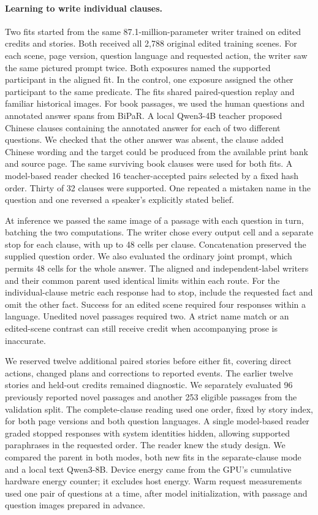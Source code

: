 \documentclass[12pt,a4paper]{article}
\providecommand{\DIFadd}[1]{{\protect\color{blue} \sf #1}} %
\begin{document}
\paragraph{\DIFadd{Learning to write individual clauses.}}
\DIFadd{Two fits started from the same 87.1-million-parameter writer trained on edited credits and stories. Both received all 2,788 original edited training scenes. For each scene, page version, question language and requested action, the writer saw the same pictured prompt twice. Both exposures named the supported participant in the aligned fit. In the control, one exposure assigned the other participant to the same predicate. The fits shared paired-question replay and familiar historical images. For book passages, we used the human questions and annotated answer spans from BiPaR. A local Qwen3-4B teacher proposed Chinese clauses containing the annotated answer for each of two different questions. We checked that the other answer was absent, the clause added Chinese wording and the target could be produced from the available print bank and source page. The same surviving book clauses were used for both fits. A model-based reader checked 16 teacher-accepted pairs selected by a fixed hash order. Thirty of 32 clauses were supported. One repeated a mistaken name in the question and one reversed a speaker's explicitly stated belief.
}

\DIFadd{At inference we passed the same image of a passage with each question in turn, batching the two computations. The writer chose every output cell and a separate stop for each clause, with up to 48 cells per clause. Concatenation preserved the supplied question order. We also evaluated the ordinary joint prompt, which permits 48 cells for the whole answer. The aligned and independent-label writers and their common parent used identical limits within each route. For the individual-clause metric each response had to stop, include the requested fact and omit the other fact. Success for an edited scene required four responses within a language. Unedited novel passages required two. A strict name match or an edited-scene contrast can still receive credit when accompanying prose is inaccurate.
}

\DIFadd{We reserved twelve additional paired stories before either fit, covering direct actions, changed plans and corrections to reported events. The earlier twelve stories and held-out credits remained diagnostic. We separately evaluated 96 previously reported novel passages and another 253 eligible passages from the validation split. The complete-clause reading used one order, fixed by story index, for both page versions and both question languages. A single model-based reader graded stopped responses with system identities hidden, allowing supported paraphrases in the requested order. The reader knew the study design. We compared the parent in both modes, both new fits in the separate-clause mode and a local text Qwen3-8B. Device energy came from the GPU's cumulative hardware energy counter; it excludes host energy. Warm request measurements used one pair of questions at a time, after model initialization, with passage and question images prepared in advance.
}
\end{document}
